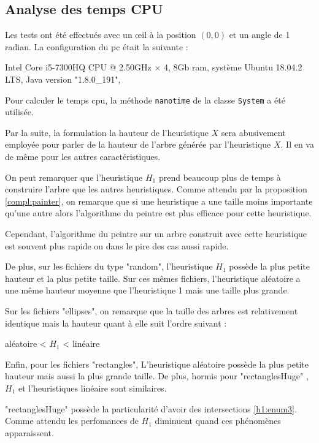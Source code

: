 \subsection{Analyse des temps CPU}
Les tests ont été effectués avec un \oe{}il à la position $(0,0)$ et un
angle de 1 radian.
La configuration du pc était la suivante :

\begin{center}
  Intel Core i5-7300HQ CPU @ 2.50GHz $\times$ 4,  8Gb ram, système Ubuntu 18.04.2 LTS,
  Java version "1.8.0\_191",
\end{center}
Pour calculer le temps cpu, la méthode \texttt{nanotime} de la classe
\texttt{System} a été utilisée.

Par la suite, la formulation la hauteur de l'heuristique $X$ sera abusivement
employée pour parler de la hauteur de l'arbre générée par l'heuristique $X$.
Il en va de même pour les autres caractéristiques.

On peut remarquer que l'heuristique $H_1$ prend beaucoup plus de
temps à construire l'arbre que les autres heuristiques.
Comme attendu par la proposition \ref{compl:painter}, on remarque
que si une heuristique a une taille moins importante qu'une autre
alors l'algorithme du peintre est plus efficace pour cette heuristique.

Cependant, l'algorithme du peintre sur un arbre construit
avec cette heuristique est souvent plus rapide ou dans le
pire des cas aussi rapide.

De plus, sur les fichiers du type "random", l'heuristique $H_1$
possède la plus petite hauteur et la plus petite taille.
Sur ces mêmes fichiers, l'heuristique aléatoire  a une même hauteur moyenne
que l'heuristique 1 mais une taille plus grande.

Sur les fichiers "ellipses", on remarque que la taille des arbres
est relativement identique mais la hauteur quant à elle suit l'ordre suivant :

\begin{center}
  aléatoire < $H_1$ < linéaire
\end{center}

Enfin, pour les fichiers "rectangles", L'heuristique aléatoire possède
la plus petite hauteur mais aussi la plus grande taille.
De plus, hormis pour  "rectanglesHuge" , $H_1$
et l'heuristiques linéaire sont similaires.

"rectanglesHuge" possède la particularité d'avoir des
intersections \ref{h1:enum3}. Comme attendu les perfomances de $H_1$
diminuent quand ces phénomènes apparaissent.


